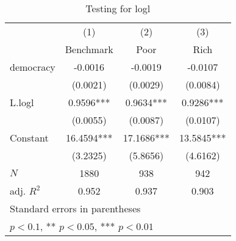 \begin{table}[htbp]\centering
\def\sym#1{\ifmmode^{#1}\else\(^{#1}\)\fi}
\caption{Testing for logl \label{tab:testinglogl}}
\begin{tabular}{l*{3}{c}}
\hline\hline
            &\multicolumn{1}{c}{(1)}&\multicolumn{1}{c}{(2)}&\multicolumn{1}{c}{(3)}\\
            &\multicolumn{1}{c}{Benchmark}&\multicolumn{1}{c}{Poor}&\multicolumn{1}{c}{Rich}\\
\hline
democracy   &     -0.0016   &     -0.0019   &     -0.0107   \\
            &    (0.0021)   &    (0.0029)   &    (0.0084)   \\
[1em]
L.logl      &      0.9596***&      0.9634***&      0.9286***\\
            &    (0.0055)   &    (0.0087)   &    (0.0107)   \\
[1em]
Constant    &     16.4594***&     17.1686***&     13.5845***\\
            &    (3.2325)   &    (5.8656)   &    (4.6162)   \\
\hline
\(N\)       &        1880   &         938   &         942   \\
adj. \(R^{2}\)&       0.952   &       0.937   &       0.903   \\
\hline\hline
\multicolumn{4}{l}{\footnotesize Standard errors in parentheses}\\
\multicolumn{4}{l}{\footnotesize * \(p<0.1\), ** \(p<0.05\), *** \(p<0.01\)}\\
\end{tabular}
\end{table}
